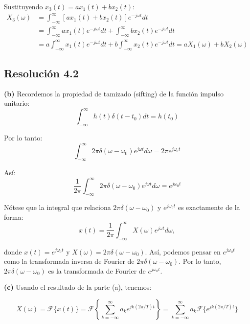 \documentclass[
  11pt,
  letterpaper,
   addpoints,
   answers
  ]{exam}
\begin{document}
\begin{questions}
\begin{solution}
Sustituyendo $x_3(t) = ax_1(t) + bx_2(t)$:
\begin{align}
X_3(\omega) &= \int_{-\infty}^{\infty} [ax_1(t) + bx_2(t)]e^{-j\omega t} dt \\
&= \int_{-\infty}^{\infty} ax_1(t)e^{-j\omega t} dt + \int_{-\infty}^{\infty} bx_2(t)e^{-j\omega t} dt \\
&= a \int_{-\infty}^{\infty} x_1(t)e^{-j\omega t} dt + b \int_{-\infty}^{\infty} x_2(t)e^{-j\omega t} dt = aX_1(\omega) + bX_2(\omega)
\end{align}

\subsection*{Resolución 4.2}

\textbf{(b)} Recordemos la propiedad de tamizado (sifting) de la función impulso unitario:
\begin{equation}
\int_{-\infty}^{\infty} h(t)\delta(t - t_0) dt = h(t_0)
\end{equation}

Por lo tanto:
\begin{equation}
\int_{-\infty}^{\infty} 2\pi\delta(\omega - \omega_0)e^{j\omega t} d\omega = 2\pi e^{j\omega_0 t}
\end{equation}

Así:
\begin{equation}
\frac{1}{2\pi} \int_{-\infty}^{\infty} 2\pi\delta(\omega - \omega_0)e^{j\omega t} d\omega = e^{j\omega_0 t}
\end{equation}

Nótese que la integral que relaciona $2\pi\delta(\omega - \omega_0)$ y $e^{j\omega_0 t}$ es exactamente de la forma:
\begin{equation}
x(t) = \frac{1}{2\pi} \int_{-\infty}^{\infty} X(\omega)e^{j\omega t} d\omega,
\end{equation}

donde $x(t) = e^{j\omega_0 t}$ y $X(\omega) = 2\pi\delta(\omega - \omega_0)$. Así, podemos pensar en $e^{j\omega_0 t}$ como la transformada inversa de Fourier de $2\pi\delta(\omega - \omega_0)$. Por lo tanto, $2\pi\delta(\omega - \omega_0)$ es la transformada de Fourier de $e^{j\omega_0 t}$.

\textbf{(c)} Usando el resultado de la parte (a), tenemos:

\begin{equation}
X(\omega) = \mathcal{F}\{x(t)\} = \mathcal{F}\left\{ \sum_{k=-\infty}^{\infty} a_k e^{jk(2\pi/T)t} \right\} = \sum_{k=-\infty}^{\infty} a_k \mathcal{F}\{e^{jk(2\pi/T)t}\}
\end{equation}


\end{solution}
\end{questions}
\end{document}
